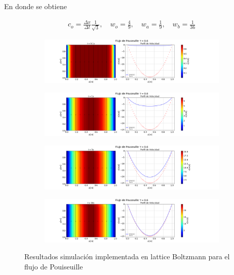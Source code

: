En donde se obtiene

\begin{eqnarray}
c_{o}=\frac{\Delta x}{\Delta t} \frac{1}{\sqrt{3}}, \quad w_{o}=\frac{4}{9}, \quad w_{a} = \frac{1}{9},\quad w_{b}= \frac{1}{36}
\end{eqnarray}


\begin{figure}[H]
\label{perfiles}
\centering
\begin{subfigure}
\centering
\includegraphics[scale=0.32]{01s.png} 
\end{subfigure}

\begin{subfigure}
\centering
\includegraphics[scale=0.32]{1s.png} 
\end{subfigure}

\begin{subfigure} 
\centering
\includegraphics[scale=0.32]{5s.png} 
 \end{subfigure}
 
\begin{subfigure}
\centering
\includegraphics[scale=0.32]{10s.png} 
 \end{subfigure}

 \caption{Resultados simulación implementada en lattice Boltzmann para el flujo de Pouiseuille}


\end{figure}



